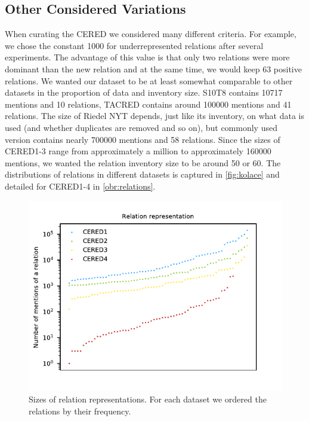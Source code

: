 \subsection{Other Considered Variations}
\label{sec:otherconsideredvariations}
When curating the CERED we considered many different criteria. For example, we chose the constant \num{1000} for underrepresented relations after several experiments. The advantage of this value is that only two relations were more dominant than the new  relation and at the same time, we would keep 63 positive relations. We wanted our dataset to be at least somewhat comparable to other datasets in the proportion of data and inventory size. S10T8 contains \num{10717} mentions and 10 relations, TACRED contains around \num{100000} mentions and 41 relations. The size of Riedel NYT depends, just like its inventory, on what data is used (and whether duplicates are removed and so on), but commonly used version contains nearly \num{700000} mentions and 58 relations. Since the sizes of CERED1-3 range from approximately a million to approximately \num{160000} mentions, we wanted the relation inventory size to be around 50 or 60. The distributions of relations in different datasets is captured in \autoref{fig:kolace} and detailed for CERED1-4 in \autoref{obr:relations}.







\begin{figure}[h]\centering
\includegraphics[scale=1]{./img/Relations1-4_valid}
\caption{Sizes of relation representations. For each dataset we ordered the relations by their frequency.}
\label{obr:relations}
\end{figure}

